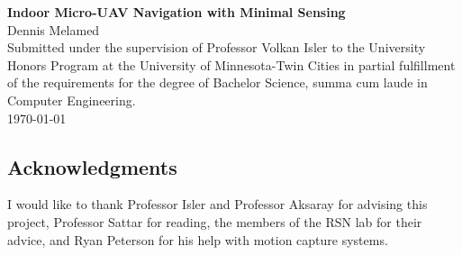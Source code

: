 

\begin{titlepage}
	\begin{center}
		\vspace{20pt}
		{\bf \LARGE Indoor Micro-UAV Navigation with Minimal Sensing} \\
		\vspace{200pt}
		Dennis Melamed\\
        \vspace{50pt}
        Submitted under the supervision of Professor Volkan Isler to the University Honors Program at the University of Minnesota-Twin Cities in partial fulfillment of the requirements for the degree of Bachelor Science, summa cum laude in Computer Engineering. \\
        \vspace{50pt}
		\today \\
	\end{center}
\end{titlepage}

\subsection*{Acknowledgments}
I would like to thank Professor Isler and Professor Aksaray for advising this project, Professor Sattar for reading, the members of the RSN lab for their advice, and Ryan Peterson for his help with motion capture systems.

